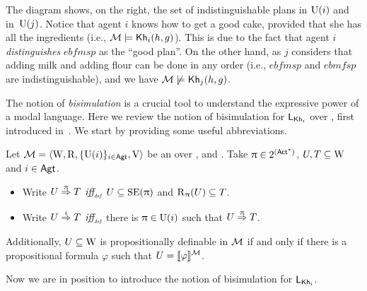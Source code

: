 \begin{example}
\medskip

The diagram shows, on the right, the set of indistinguishable plans in $\operatorname{U}(i)$ and in~$\operatorname{U}(j)$. %
Notice that agent $i$ knows how to get a good cake, provided that she has all the ingredients (i.e., $\mathcal{M}\models{\sf Kh}_i(h,g)$). This is due to the fact
that agent $i$ \emph{distinguishes} $\mathit{ebfmsp}$ as the ``good plan''. On the other hand, as $j$ considers that adding milk and adding flour can be done in any order (i.e., $\mathit{ebfmsp}$ and $\mathit{ebmfsp}$ are indistinguishable), and we have $\mathcal{M}\not\models{\sf Kh}_j(h,g)$.
\end{example}

\medskip 

The notion of \emph{bisimulation} is a crucial tool to understand the expressive power of a modal language. Here we review the notion of bisimulation for $\mathsf{L}_{{\sf Kh}_i}$ over \ultss, first introduced in~\cite{AFSVQ23report}. We start by providing some useful abbreviations.

\medskip

\begin{definition}\label{def:notation}
Let $\mathcal{M}=\langle \operatorname{W},\operatorname{R},\{ \operatorname{U}(i) \}_{i\in{\rm \sf Agt}},\operatorname{V} \rangle$ be an \ults over \PROP, \ACT and \AGT. Take $\uppi \in 2^{({\rm \sf Act}^*)}$, $U, T \subseteq \operatorname{W}$ and $i \in {\rm \sf Agt}$.
\begin{itemize} \itemsep 0pt
    \item Write $U \stackrel{\uppi}{\Rightarrow} T$ $\mbox{\it iff}_{\mbox{\tiny\it def}}$ $U \subseteq \operatorname{SE}(\uppi)$ and $\operatorname{R}_{\uppi}(U) \subseteq T$.

    \item Write $U \stackrel{i}{\Rightarrow} T$ $\mbox{\it iff}_{\mbox{\tiny\it def}}$ there is $\uppi \in \operatorname{U}(i)$ such that $U \stackrel{\uppi}{\Rightarrow} T$.
\end{itemize}
Additionally, $U \subseteq \operatorname{W}$ is propositionally definable in $\mathcal{M}$ if and only if there is a propositional formula $\varphi$ such that $U = \llbracket \varphi \rrbracket^{\mathcal{M}}$.
\end{definition}

\medskip

Now we are in position to introduce the notion of bisimulation for $\mathsf{L}_{{\sf Kh}_i}$. 

\medskip 

